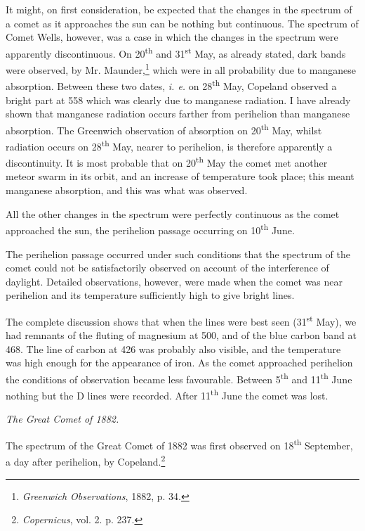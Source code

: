 \documentclass[a4paper, 12pt, oneside, polutonikogreek, english]{article}
\begin{document}
It might, on first consideration, be expected that the changes in the spectrum of a comet as it approaches the sun can be nothing but continuous. The spectrum of Comet Wells, however, was a case in which the changes in the spectrum were apparently discontinuous. On 20\textsuperscript{th} and 31\textsuperscript{st} May, as already stated, dark bands were observed, by Mr. Maunder,\footnote{\emph{Greenwich Observations}, 1882, p. 34.} which were in all probability due to manganese absorption. Between these two dates, \emph{i. e.} on 28\textsuperscript{th} May, Copeland observed a bright part at 558 which was clearly due to manganese radiation. I have already shown that manganese radiation occurs farther from perihelion than manganese absorption. The Greenwich observation of absorption on 20\textsuperscript{th} May, whilst radiation occurs on 28\textsuperscript{th} May, nearer to perihelion, is therefore apparently a discontinuity. It is most probable that on 20\textsuperscript{th} May the comet met another meteor swarm in its orbit, and an increase of temperature took place; this meant manganese absorption, and this was what was observed.

All the other changes in the spectrum were perfectly continuous as the comet approached the sun, the perihelion passage occurring on 10\textsuperscript{th} June.

The perihelion passage occurred under such conditions that the spectrum of the comet could not be satisfactorily observed on account of the interference of daylight. Detailed observations, however, were made when the comet was near perihelion and its temperature sufficiently high to give bright lines.

The complete discussion shows that when the lines were best seen (31\textsuperscript{st} May), we had remnants of the fluting of magnesium at 500, and of the blue carbon band at 468. The line of carbon at 426 was probably also visible, and the temperature was high enough for the appearance of iron. As the comet approached perihelion the conditions of observation became less favourable. Between 5\textsuperscript{th} and 11\textsuperscript{th} June nothing but the D lines were recorded. After 11\textsuperscript{th} June the comet was lost.

\emph{The Great Comet of 1882.}

The spectrum of the Great Comet of 1882 was first observed on 18\textsuperscript{th} September, a day after perihelion, by Copeland.\footnote{\emph{Copernicus}, vol. 2. p. 237.}
\end{document}
